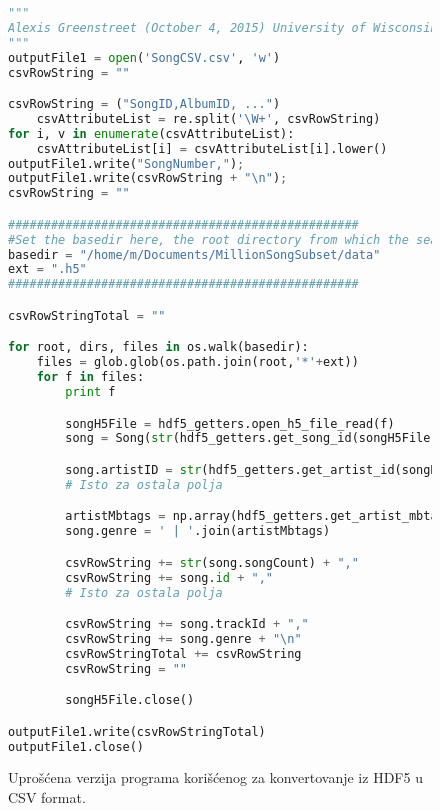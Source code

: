 \begin{figure}[h]
\lstset{style=mystyle}
\begin{lstlisting}[language=Python, basicstyle=\footnotesize]
"""
Alexis Greenstreet (October 4, 2015) University of Wisconsin-Madison
"""
outputFile1 = open('SongCSV.csv', 'w')
csvRowString = ""

csvRowString = ("SongID,AlbumID, ...")
	csvAttributeList = re.split('\W+', csvRowString)
for i, v in enumerate(csvAttributeList):
    csvAttributeList[i] = csvAttributeList[i].lower()
outputFile1.write("SongNumber,");
outputFile1.write(csvRowString + "\n");
csvRowString = ""

#################################################
#Set the basedir here, the root directory from which the search
basedir = "/home/m/Documents/MillionSongSubset/data"
ext = ".h5"
#################################################

csvRowStringTotal = ""

for root, dirs, files in os.walk(basedir):
    files = glob.glob(os.path.join(root,'*'+ext))
    for f in files:
        print f

        songH5File = hdf5_getters.open_h5_file_read(f)
        song = Song(str(hdf5_getters.get_song_id(songH5File)))

        song.artistID = str(hdf5_getters.get_artist_id(songH5File))
        # Isto za ostala polja

        artistMbtags = np.array(hdf5_getters.get_artist_mbtags(songH5File))
        song.genre = ' | '.join(artistMbtags)

        csvRowString += str(song.songCount) + ","
        csvRowString += song.id + ","
        # Isto za ostala polja

        csvRowString += song.trackId + ","
        csvRowString += song.genre + "\n"
        csvRowStringTotal += csvRowString
        csvRowString = ""

        songH5File.close()

outputFile1.write(csvRowStringTotal)
outputFile1.close()
\end{lstlisting}
\label{code:ConvertToCSV}
\caption{Upro\v{s}\'c{}ena verzija programa kori\v{s}\'c{}enog za konvertovanje iz HDF5 u CSV format.}
\end{figure}
